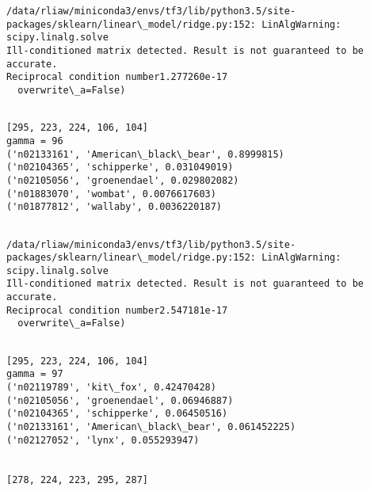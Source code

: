 \documentclass[11pt]{article}
\begin{document}
    \begin{Verbatim}[commandchars=\\\{\}]
/data/rliaw/miniconda3/envs/tf3/lib/python3.5/site-packages/sklearn/linear\_model/ridge.py:152: LinAlgWarning: scipy.linalg.solve
Ill-conditioned matrix detected. Result is not guaranteed to be accurate.
Reciprocal condition number1.277260e-17
  overwrite\_a=False)

    \end{Verbatim}

    \begin{Verbatim}[commandchars=\\\{\}]

[295, 223, 224, 106, 104]
gamma = 96
('n02133161', 'American\_black\_bear', 0.8999815)
('n02104365', 'schipperke', 0.031049019)
('n02105056', 'groenendael', 0.029802082)
('n01883070', 'wombat', 0.0076617603)
('n01877812', 'wallaby', 0.0036220187)


    \end{Verbatim}

    \begin{Verbatim}[commandchars=\\\{\}]
/data/rliaw/miniconda3/envs/tf3/lib/python3.5/site-packages/sklearn/linear\_model/ridge.py:152: LinAlgWarning: scipy.linalg.solve
Ill-conditioned matrix detected. Result is not guaranteed to be accurate.
Reciprocal condition number2.547181e-17
  overwrite\_a=False)

    \end{Verbatim}

    \begin{Verbatim}[commandchars=\\\{\}]

[295, 223, 224, 106, 104]
gamma = 97
('n02119789', 'kit\_fox', 0.42470428)
('n02105056', 'groenendael', 0.06946887)
('n02104365', 'schipperke', 0.06450516)
('n02133161', 'American\_black\_bear', 0.061452225)
('n02127052', 'lynx', 0.055293947)


[278, 224, 223, 295, 287]

    \end{Verbatim}

    \begin{center}
    \end{center}
    { \hspace*{\fill} \\}
    
\end{document}

